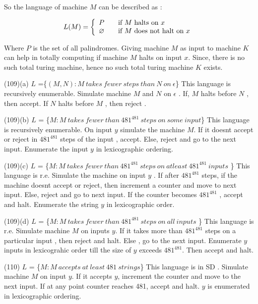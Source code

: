 \documentclass[addpoints,12pt]{exam}
\begin{document}
\begin{questions}
\begin{itemize}
\end{itemize}
  So the language of machine $M$ can be described as : 
  
  \[
    L(M) = \left\{ 
  \begin{array}{l l}
     P & \quad \text{if $M$ halts on $x$}\\
     \varnothing & \quad \text{if $M$ does not halt on $x$}\\
  \end{array} \right.
\]
  
  Where $P$ is the set of all palindromes.\newline
  Giving machine $M$ as input to machine $K$ can help in totally computing if machine $M$ halts on input $x$. Since, there is no such total turing machine, hence no such total turing machine $K$ exists. 
	
	(109)(a) \quad
	$L$ =\{$(M,N):M~takes~fewer~steps~than~N~on~\epsilon$\} \newline
	This language is recursively enumerable. Simulate machine $M$ and $N$ on $\epsilon$ . If, $M$ halts before $N$ , then accept. If $N$ halts before $M$ , then reject .
	
	(109)(b) \quad
	$L$ = \{$M:M~takes~fewer~than~481^{481}~steps~on~some~input $\} \newline
		This language is recursively enumerable. 
		On input $y$ simulate the machine $M$. If it doesnt accept or reject in $481^{481}$ steps of the input , accept. Else, reject and go to the next input. Enumerate the input $y$ in lexicographic ordering.
	
	(109)(c) \quad	
	$L$ = \{$M:M~takes~fewer~than~481^{481}~steps~on~atleast~481^{481}~inputs$ \} \newline
	This language is r.e. Simulate the machine on input $y$ . If after $481^{481}$ steps, if the machine doesnt accept or reject, then increment a counter and move to next input. Else, reject and go to next input. If the counter becomes $481^{481}$ , accept and halt. Enumerate the string $y$ in lexicographic order. 
	
	(109)(d) \quad	
	$L$ = \{$M:M~takes~fewer~than~481^{481}~steps~on~all~inputs$ \} \newline
		This language is r.e. Simulate machine $M$ on inputs $y$. If it takes more than $481^{481}$ steps on a particular input , then reject and halt. Else , go to the next input. Enumerate $y$ inputs in lexicograhic order till the size of $y$ exceeds $481^{481}$. Then accept and halt.
	
	(110) \quad	
	$L$ = \{$M:M~accepts~at~least~481~strings$\}  \newline
	This language is in SD . Simulate machine $M$ on input $y$. If it accepts $y$, increment the counter and move to the next input. If at any point 
	counter reaches 481, accept and halt. $y$ is enumerated in lexicographic ordering. \newline
	

\end{questions}
\end{document}
